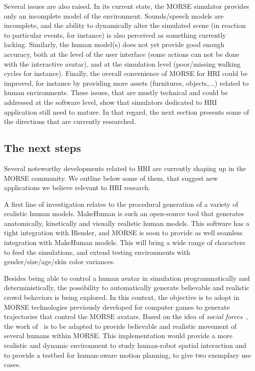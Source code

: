 \documentclass{llncs}
\begin{document}
Several issues are also raised. In its current state, the MORSE simulator
provides only an incomplete model of the environment. Sounds/speech models are
incomplete, and the ability to dynamically alter the simulated scene (in reaction
to particular events, for instance) is also perceived as something currently lacking.
Similarly, the human model(s) does not yet provide good enough accuracy, both at
the level of the user interface (some actions can not be done with the
interactive avatar), and at the simulation level (poor/missing walking cycles
for instance). Finally, the overall convenience of MORSE for HRI could be
improved, for instance by providing more assets (furnitures, objects,...)
related to human environments.  These issues, that are mostly technical and
could be addressed at the software level, show that simulators dedicated to HRI
application still need to mature.  In that regard, the next section presents
some of the directions that are currently researched.

\subsection*{The next steps}

Several noteworthy developments related to HRI are currently shaping up in the
MORSE community. We outline below some of them, that suggest new applications we
believe relevant to HRI research.

A first line of investigation relates to the procedural generation of a variety
of realistic human models. {\sc MakeHuman} is such an open-source tool that
generates anatomically, kinetically and visually realistic human models. This software has a tight integration with Blender,
and MORSE is soon to provide as well seamless integration with {\sc MakeHuman}
models. This will bring a wide range of characters to feed the simulations,
and extend testing environments with gender/size/age/skin color variances.

Besides being able to control a human avatar in simulation programmatically and
deterministically, the possibility to automatically generate believable and
realistic crowd behaviors is being explored. In this context, the objective is
to adopt in MORSE technologies previously developed for computer games to generate
trajectories that control the MORSE avatars. Based on the idea of \emph{social
forces}~\cite{helbing2001}, the work of~\cite{Szymanezyk2012crowd} is to be
adapted to provide believable and realistic movement of several humans within
MORSE. This
implementation would provide a more realistic and dynamic environment to study
human-robot spatial interaction and to provide a testbed for human-aware motion
planning, to give two exemplary use cases.
\end{document}
